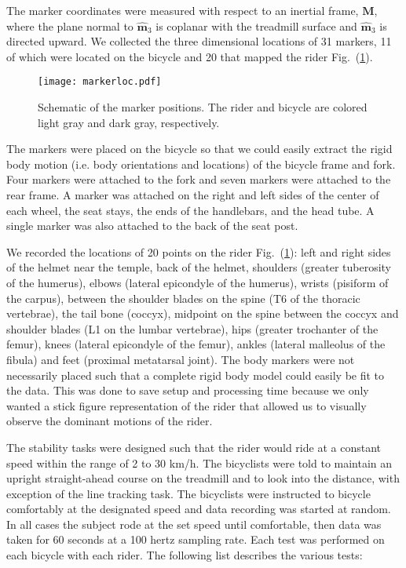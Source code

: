 \documentclass[smallextended]{svjour3}     %
\begin{document}
The marker coordinates were measured with respect to an inertial frame,
$\mathbf{M}$, where the plane normal to $\hat{\mathbf{m}}_3$ is coplanar with
the treadmill surface and $\hat{\mathbf{m}}_3$ is directed upward. We collected
the three dimensional locations of 31 markers, 11 of which were located on the
bicycle and 20 that mapped the rider Fig.~(\ref{fig:markerloc}).
\begin{figure}
    \centering
        \texttt{[image: markerloc.pdf]}
    \caption{Schematic of the marker positions. The rider and bicycle are colored light gray and dark gray, respectively.}
    \label{fig:markerloc}
\end{figure}

The markers were placed on the bicycle so that we could easily extract the
rigid body motion (i.e. body orientations and locations) of the bicycle frame
and fork. Four markers were attached to the fork and seven markers were
attached to the rear frame. A marker was attached on the right and left sides
of the center of each wheel, the seat stays, the ends of the handlebars, and
the head tube. A single marker was also attached to the back of the seat post.

We recorded the locations of 20 points
on the rider Fig.~(\ref{fig:markerloc}): left and right sides of
the helmet near the temple, back of the helmet, shoulders (greater tuberosity
of the humerus), elbows (lateral epicondyle of the humerus), wrists (pisiform
of the carpus), between the
shoulder blades on the spine (T6 of the thoracic vertebrae), the tail bone
(coccyx), midpoint on the spine between the coccyx and shoulder blades (L1 on
the lumbar vertebrae), hips (greater trochanter of the femur), knees (lateral
epicondyle of the femur), ankles (lateral malleolus of the fibula) and feet
(proximal metatarsal joint). The body markers were not necessarily placed such
that a complete rigid body model could easily be fit to the data. This was done
to save setup and processing time because we only wanted a stick figure
representation of the rider that allowed us to visually observe the dominant
motions of the rider.

The stability tasks were designed such that the rider would ride at a constant speed
within the range of 2 to 30 km/h. The bicyclists were told to maintain an
upright straight-ahead course on the treadmill and to look into the distance,
with exception of the line tracking task. The bicyclists were instructed to
bicycle comfortably at the designated speed and data recording was started
at random. In all cases the subject rode at the set speed until comfortable,
then data was taken for 60 seconds at a 100 hertz sampling rate. Each test was
performed on each bicycle with each rider. The following list describes the various
tests:
\end{document}
